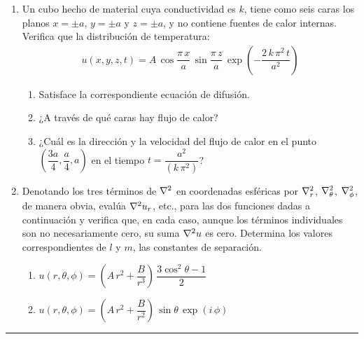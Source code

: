 \begin{enumerate}
\item Un cubo hecho de material cuya conductividad es $k$, tiene como seis caras los planos $x = \pm a$, $y = \pm a$ y $z = \pm a$, y no contiene fuentes de calor internas. Verifica que la distribución de temperatura:
\begin{align*}
u (x, y, z, t) = A \, \cos \dfrac{\pi \, x}{a} \, \sin \dfrac{\pi \, z}{a} \, \exp \left( - \dfrac{2 \, k \, \pi^{2} \, t}{a^{2}} \right)
\end{align*}
\begin{enumerate}[label=\alph*)]
\item Satisface la correspondiente ecuación de difusión.
\item ¿A través de qué caras hay flujo de calor?
\item ¿Cuál es la dirección y la velocidad del flujo de calor en el punto \hfill \break $\left(\dfrac{3 a}{4}, \dfrac{a}{4}, a \right)$ en el tiempo $t = \dfrac{a^{2}}{(k \, \pi^{2})}$?
\end{enumerate}
\item Denotando los tres términos de $\laplacian$ en coordenadas esféricas por $\laplacian_{r}$, $\laplacian_{\theta}$, $\laplacian_{\phi}$, de manera obvia, evalúa $\laplacian{u}_{r}$, etc., para las dos funciones dadas a continuación y verifica que, en cada caso, aunque los términos individuales son no necesariamente cero, su suma $\laplacian{u}$ es cero. Determina los valores correspondientes de $l$ y $m$, las constantes de separación.
\begin{enumerate}[label=\alph*)]
\item $u(r, \theta, \phi) = \left( A \, r^{2} + \dfrac{B}{r^{3}} \right) \, \dfrac{3 \cos^{2} \theta - 1}{2}$
\item $u(r, \theta, \phi) = \left( A \, r^{2} + \dfrac{B}{r^{2}} \right) \, \sin \theta \, \exp(i \, \phi)$
\end{enumerate}
\end{enumerate}

\rule{15cm}{0.4pt}

